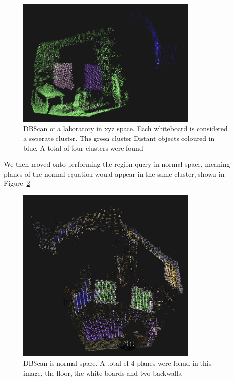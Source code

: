 \documentclass[]{article}
\begin{document}
{\begin{figure}[tbp]
	\begin{center}
		\includegraphics[width=0.8\textwidth]{6table_dbscan.png}
	\end{center}
	\caption{\ac{DBScan} of a laboratory in xyz space. Each whiteboard is considered a seperate cluster. The green cluster Distant objects coloured in blue. A total of four clusters were found}
	\label{fig:table_dbscan}
\end{figure}

We then moved onto performing the region query in normal space, meaning planes of the normal equation would appear in the same cluster, shown in Figure~\ref{fig:dbscan_planes}

\begin{figure}[tbp]
	\begin{center}
		\includegraphics[width=0.8\textwidth]{6normal_boards.png}
	\end{center}
	\caption{\ac{DBScan} is normal space. A total of 4 planes were fonud in this image, the floor, the white boards and two backwalls.}
	\label{fig:dbscan_planes}
\end{figure}

}
\end{document}
